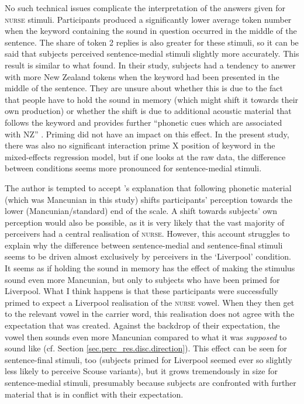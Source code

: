 No such technical issues complicate the interpretation of the answers given for \textsc{nurse} stimuli.
Participants produced a significantly lower average token number when the keyword containing the sound in question occurred in the middle of the sentence.
The share of token 2 replies is also greater for these stimuli, so it can be said that subjects perceived sentence-medial stimuli slightly more accurately.
This result is similar to what \textcite{hayetal2006a} found.
In their study, subjects had a tendency to answer with more New Zealand tokens when the keyword had been presented in the middle of the sentence.
They are unsure about whether this is due to the fact that people have to hold the sound in memory (which might shift it towards their own production) or whether the shift is due to additional acoustic material that follows the keyword and provides further ``phonetic cues which are associated with NZ'' \parencite[365]{hayetal2006a}.
Priming did not have an impact on this effect.
In the present study, there was also no significant interaction prime X position of keyword in the mixed-effects regression model, but if one looks at the raw data, the difference between  conditions seems more pronounced for sentence-medial stimuli.

The author is tempted to accept \textcite{hayetal2006a}'s explanation that following phonetic material (which was Mancunian in this study) shifts participants' perception towards the lower (Mancunian/standard) end of the scale.
A shift towards subjects' own perception would also be possible, as it is very likely that the vast majority of perceivers had a central realisation of \textsc{nurse}.
However, this account struggles to explain why the difference between sentence-medial and sentence-final stimuli seems to be driven almost exclusively by perceivers in the `Liverpool' condition.
It seems as if holding the sound in memory has the effect of making the stimulus sound even more Mancunian, but only to subjects who have been primed for Liverpool.
What I think happens is that these participants were successfully primed to expect a Liverpool realisation of the \textsc{nurse} vowel.
When they then get to the relevant vowel in the carrier word, this realisation does not agree with the expectation that was created.
Against the backdrop of their expectation, the vowel then sounds even more Mancunian compared to what it was \emph{supposed} to sound like (cf. Section \ref{sec.perc_res.disc.direction}).
This effect can be seen for sentence-final stimuli, too (subjects primed for Liverpool seemed ever so slightly less likely to perceive Scouse variants), but it grows tremendously in size for sentence-medial stimuli, presumably because subjects are confronted with further material that is in conflict with their expectation.

